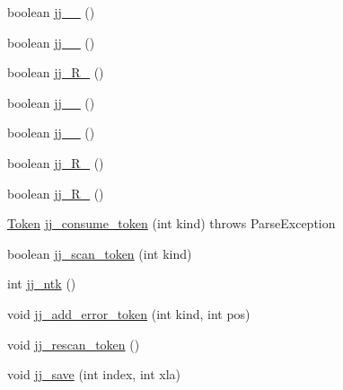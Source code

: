 \begin{DoxyCompactItemize}
\item 
boolean \hyperlink{classuk_1_1ac_1_1manchester_1_1cs_1_1owlapi_1_1dlsyntax_1_1parser_1_1_d_l_syntax_parser_a1720f24e5c93358e6619a4bf9a2698d7}{jj\-\_\-\_} ()
\item 
boolean \hyperlink{classuk_1_1ac_1_1manchester_1_1cs_1_1owlapi_1_1dlsyntax_1_1parser_1_1_d_l_syntax_parser_a12ac13265b365bde68c780f89312b5b2}{jj\-\_\-\_} ()
\item 
boolean \hyperlink{classuk_1_1ac_1_1manchester_1_1cs_1_1owlapi_1_1dlsyntax_1_1parser_1_1_d_l_syntax_parser_a3f0bbf28df53745da7d2440c1d9f31cb}{jj\-\_\-R\-\_} ()
\item 
boolean \hyperlink{classuk_1_1ac_1_1manchester_1_1cs_1_1owlapi_1_1dlsyntax_1_1parser_1_1_d_l_syntax_parser_aec9f3a346bd0589700d5e84c837d7fd4}{jj\-\_\-\_} ()
\item 
boolean \hyperlink{classuk_1_1ac_1_1manchester_1_1cs_1_1owlapi_1_1dlsyntax_1_1parser_1_1_d_l_syntax_parser_a34b768a04739a75adcf70687db9377fa}{jj\-\_\-\_} ()
\item 
boolean \hyperlink{classuk_1_1ac_1_1manchester_1_1cs_1_1owlapi_1_1dlsyntax_1_1parser_1_1_d_l_syntax_parser_a12c6a08bd9e7987ec4e5726508251357}{jj\-\_\-R\-\_} ()
\item 
boolean \hyperlink{classuk_1_1ac_1_1manchester_1_1cs_1_1owlapi_1_1dlsyntax_1_1parser_1_1_d_l_syntax_parser_af7f002467e78ba33f1f7ccaa01007908}{jj\-\_\-R\-\_} ()
\item 
\hyperlink{classuk_1_1ac_1_1manchester_1_1cs_1_1owlapi_1_1dlsyntax_1_1parser_1_1_token}{Token} \hyperlink{classuk_1_1ac_1_1manchester_1_1cs_1_1owlapi_1_1dlsyntax_1_1parser_1_1_d_l_syntax_parser_a9b06a9128007eac401e7fe52ba3d6087}{jj\-\_\-consume\-\_\-token} (int kind)  throws Parse\-Exception 
\item 
boolean \hyperlink{classuk_1_1ac_1_1manchester_1_1cs_1_1owlapi_1_1dlsyntax_1_1parser_1_1_d_l_syntax_parser_a957a273615339a1815baf7b68f2f8b9d}{jj\-\_\-scan\-\_\-token} (int kind)
\item 
int \hyperlink{classuk_1_1ac_1_1manchester_1_1cs_1_1owlapi_1_1dlsyntax_1_1parser_1_1_d_l_syntax_parser_a2b67a285b7fbc06e021d352af7a51fe1}{jj\-\_\-ntk} ()
\item 
void \hyperlink{classuk_1_1ac_1_1manchester_1_1cs_1_1owlapi_1_1dlsyntax_1_1parser_1_1_d_l_syntax_parser_af73ce80eb0b5bdba43338e2e70d17680}{jj\-\_\-add\-\_\-error\-\_\-token} (int kind, int pos)
\item 
void \hyperlink{classuk_1_1ac_1_1manchester_1_1cs_1_1owlapi_1_1dlsyntax_1_1parser_1_1_d_l_syntax_parser_a91bc5646996d175bb4d8cad8c675d0ba}{jj\-\_\-rescan\-\_\-token} ()
\item 
void \hyperlink{classuk_1_1ac_1_1manchester_1_1cs_1_1owlapi_1_1dlsyntax_1_1parser_1_1_d_l_syntax_parser_adca80b228102fb1e6e277ddd6de6c368}{jj\-\_\-save} (int index, int xla)
\end{DoxyCompactItemize}
